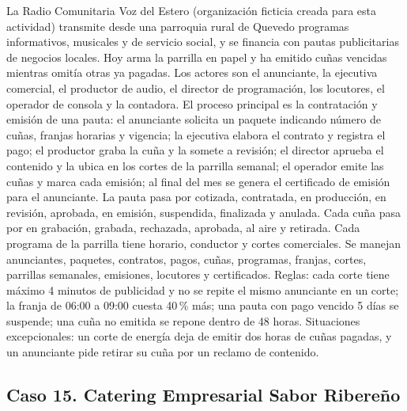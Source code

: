 \documentclass[11pt]{article}
\newcommand{\subseccion}[1]{\subsection{\textcolor{midblue}{#1}}}
\begin{document}
La Radio Comunitaria Voz del Estero (organización ficticia creada para esta actividad) transmite desde una parroquia rural de Quevedo programas informativos, musicales y de servicio social, y se financia con pautas publicitarias de negocios locales. Hoy arma la parrilla en papel y ha emitido cuñas vencidas mientras omitía otras ya pagadas. Los actores son el anunciante, la ejecutiva comercial, el productor de audio, el director de programación, los locutores, el operador de consola y la contadora. El proceso principal es la contratación y emisión de una pauta: el anunciante solicita un paquete indicando número de cuñas, franjas horarias y vigencia; la ejecutiva elabora el contrato y registra el pago; el productor graba la cuña y la somete a revisión; el director aprueba el contenido y la ubica en los cortes de la parrilla semanal; el operador emite las cuñas y marca cada emisión; al final del mes se genera el certificado de emisión para el anunciante. La pauta pasa por cotizada, contratada, en producción, en revisión, aprobada, en emisión, suspendida, finalizada y anulada. Cada cuña pasa por en grabación, grabada, rechazada, aprobada, al aire y retirada. Cada programa de la parrilla tiene horario, conductor y cortes comerciales. Se manejan anunciantes, paquetes, contratos, pagos, cuñas, programas, franjas, cortes, parrillas semanales, emisiones, locutores y certificados. Reglas: cada corte tiene máximo 4 minutos de publicidad y no se repite el mismo anunciante en un corte; la franja de 06:00 a 09:00 cuesta 40\,\% más; una pauta con pago vencido 5 días se suspende; una cuña no emitida se repone dentro de 48 horas. Situaciones excepcionales: un corte de energía deja de emitir dos horas de cuñas pagadas, y un anunciante pide retirar su cuña por un reclamo de contenido.

\subseccion{Caso 15. Catering Empresarial Sabor Ribereño}
\end{document}
